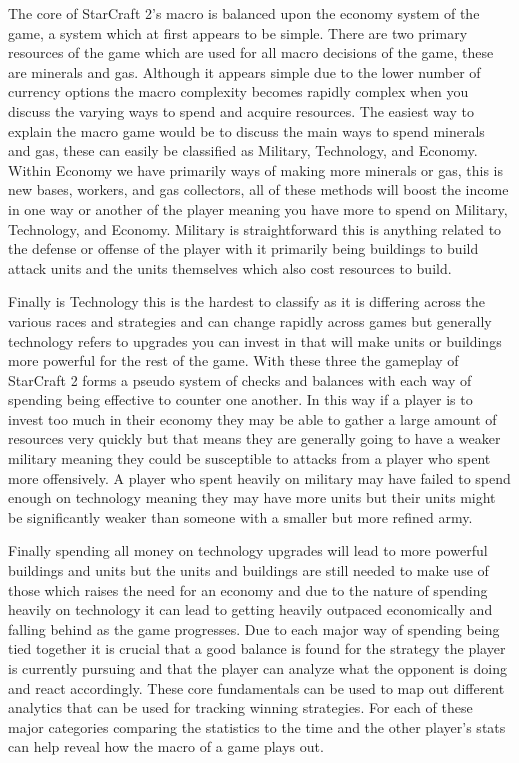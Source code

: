 \documentclass[a4paper,12pt]{report}
\begin{document}
The core of StarCraft 2’s macro is balanced upon the economy system of the game, a system which at first appears to be simple. There are two primary resources of the game which are used for all macro decisions of the game, these are minerals and gas. Although it appears simple due to the lower number of currency options the macro complexity becomes rapidly complex when you discuss the varying ways to spend and acquire resources. The easiest way to explain the macro game would be to discuss the main ways to spend minerals and gas, these can easily be classified as Military, Technology, and Economy. Within Economy we have primarily ways of making more minerals or gas, this is new bases, workers, and gas collectors, all of these methods will boost the income in one way or another of the player meaning you have more to spend on Military, Technology, and Economy. Military is straightforward this is anything related to the defense or offense of the player with it primarily being buildings to build attack units and the units themselves which also cost resources to build.

Finally is Technology this is the hardest to classify as it is differing across the various races and strategies and can change rapidly across games but generally technology refers to upgrades you can invest in that will make units or buildings more powerful for the rest of the game. With these three the gameplay of StarCraft 2 forms a pseudo system of checks and balances with each way of spending being effective to counter one another. In this way if a player is to invest too much in their economy they may be able to gather a large amount of resources very quickly but that means they are generally going to have a weaker military meaning they could be susceptible to attacks from a player who spent more offensively. A player who spent heavily on military may have failed to spend enough on technology meaning they may have more units but their units might be significantly weaker than someone with a smaller but more refined army.

Finally spending all money on technology upgrades will lead to more powerful buildings and units but the units and buildings are still needed to make use of those which raises the need for an economy and due to the nature of spending heavily on technology it can lead to getting heavily outpaced economically and falling behind as the game progresses. Due to each major way of spending being tied together it is crucial that a good balance is found for the strategy the player is currently pursuing and that the player can analyze what the opponent is doing and react accordingly. These core fundamentals can be used to map out different analytics that can be used for tracking winning strategies. For each of these major categories comparing the statistics to the time and the other player’s stats can help reveal how the macro of a game plays out.
\end{document}
